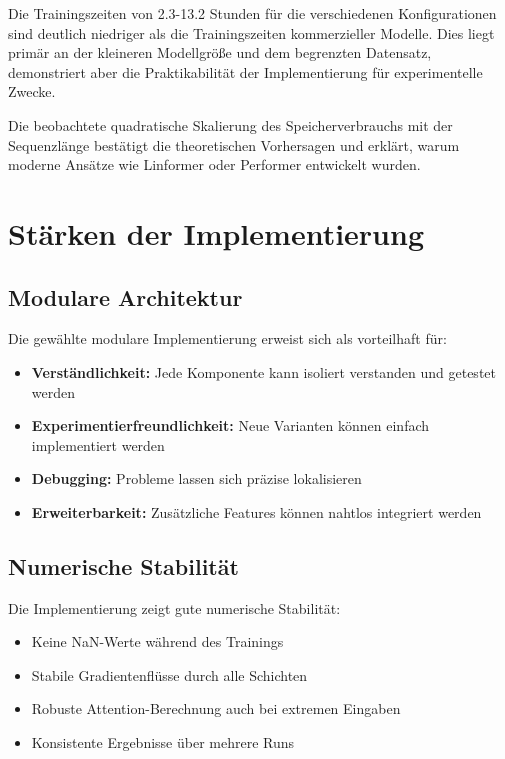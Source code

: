 Die Trainingszeiten von 2.3-13.2 Stunden für die verschiedenen Konfigurationen sind deutlich niedriger als die Trainingszeiten kommerzieller Modelle. Dies liegt primär an der kleineren Modellgröße und dem begrenzten Datensatz, demonstriert aber die Praktikabilität der Implementierung für experimentelle Zwecke.

Die beobachtete quadratische Skalierung des Speicherverbrauchs mit der Sequenzlänge bestätigt die theoretischen Vorhersagen und erklärt, warum moderne Ansätze wie Linformer oder Performer entwickelt wurden.

\section{Stärken der Implementierung}

\subsection{Modulare Architektur}

Die gewählte modulare Implementierung erweist sich als vorteilhaft für:
\begin{itemize}
    \item \textbf{Verständlichkeit:} Jede Komponente kann isoliert verstanden und getestet werden
    \item \textbf{Experimentierfreundlichkeit:} Neue Varianten können einfach implementiert werden
    \item \textbf{Debugging:} Probleme lassen sich präzise lokalisieren
    \item \textbf{Erweiterbarkeit:} Zusätzliche Features können nahtlos integriert werden
\end{itemize}

\subsection{Numerische Stabilität}

Die Implementierung zeigt gute numerische Stabilität:
\begin{itemize}
    \item Keine NaN-Werte während des Trainings
    \item Stabile Gradientenflüsse durch alle Schichten
    \item Robuste Attention-Berechnung auch bei extremen Eingaben
    \item Konsistente Ergebnisse über mehrere Runs
\end{itemize}

